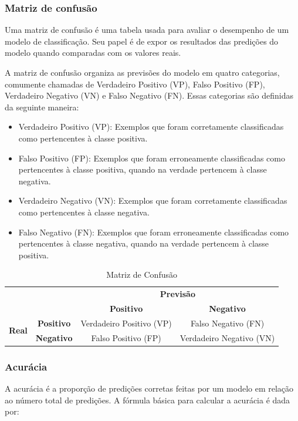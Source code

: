 \subsubsection{Matriz de confusão}

Uma matriz de confusão é uma tabela usada para avaliar o desempenho de um modelo de classificação.
Seu papel é de expor os resultados das predições do modelo quando comparadas com os valores reais.

A matriz de confusão organiza as previsões do modelo em quatro categorias, comumente chamadas de Verdadeiro Positivo (VP), 
Falso Positivo (FP), Verdadeiro Negativo (VN) e Falso Negativo (FN). Essas categorias são definidas da seguinte maneira:

\begin{itemize}
  \item Verdadeiro Positivo (VP): Exemplos que foram corretamente classificadas como pertencentes à classe positiva.
  \item Falso Positivo (FP): Exemplos que foram erroneamente classificadas como pertencentes à classe positiva, quando na verdade pertencem à classe negativa.
  \item Verdadeiro Negativo (VN): Exemplos que foram corretamente classificadas como pertencentes à classe negativa. 
  \item Falso Negativo (FN): Exemplos que foram erroneamente classificadas como pertencentes à classe negativa, quando na verdade pertencem à classe positiva.
\end{itemize}

\begin{table}[h]
  \centering
  \begin{tabular}{c|c|c|c|}
  & & \multicolumn{2}{c|}{\textbf{Previsão}} \\ \cline{3-4}
  & & \textbf{Positivo} & \textbf{Negativo} \\ \hline
  \multicolumn{1}{|c|}{\multirow{2}{*}{\textbf{Real}}} & \textbf{Positivo} & Verdadeiro Positivo (VP) & Falso Negativo (FN) \\ \cline{2-4}
  \multicolumn{1}{|c|}{} & \textbf{Negativo} & Falso Positivo (FP) & Verdadeiro Negativo (VN) \\ \hline
  \end{tabular}
  \caption{Matriz de Confusão}
  \label{table:confusion_matrix}
\end{table}

\subsubsection{Acurácia}
A acurácia é a proporção de predições corretas feitas por um modelo em relação ao número total de predições. 
A fórmula básica para calcular a acurácia é dada por:

